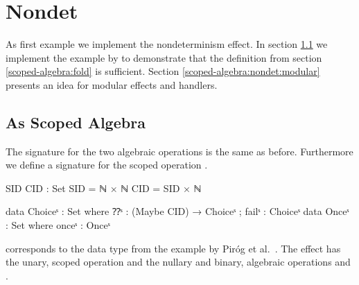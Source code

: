 \section{Nondet}

As first example we implement the nondeterminism effect.
In section \ref{scoped-algebra:nondet:scoped-algebra} we implement the example
by \textcite{DBLP:conf/lics/PirogSWJ18} to demonstrate that the
 definition from section \ref{scoped-algebra:fold} is
sufficient.
Section \ref{scoped-algebra:nondet:modular} presents an idea for modular effects
and handlers.

\subsection{As Scoped Algebra}
\label{scoped-algebra:nondet:scoped-algebra}
The signature for the two algebraic operations is the same as before.
Furthermore we define a signature for the scoped operation .

\begin{code}[hide]
SID CID : Set
SID = ℕ × ℕ
CID = SID × ℕ
\end{code}
\begin{code}
data Choiceˢ  : Set where ⁇ˢ : (Maybe CID) → Choiceˢ ; failˢ : Choiceˢ
data Onceˢ    : Set where onceˢ : Onceˢ
\end{code}
 corresponds to the data type from the example by Piróg et
al.~\cite[sec.~6]{DBLP:conf/lics/PirogSWJ18}.
The effect has the unary, scoped operation  and the nullary
and binary, algebraic operations  and .

